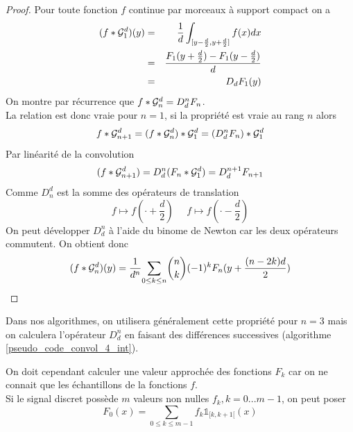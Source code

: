\begin{proof}
Pour toute fonction $f$ continue par morceaux à support compact on a 
\begin{eqnarray*}
(f * \mathcal{G}_1^d )(y)&=&\frac{1}{d} \int_{[y-\frac{d}{2},y+\frac{d}{2}]} f(x) dx\\
               &=&\frac{F_{1}(y+\frac{d}{2})-F_{1}(y-\frac{d}{2})}{d}\\
               &=&D_d F_{1}(y)
\end{eqnarray*}
On montre par récurrence que $ f*\mathcal{G}_n^d=D_d^n F_{n}$.\\
La relation est donc vraie pour $n=1$, si la propriété est vraie au rang $n$ alors
\begin{equation*}
f*\mathcal{G}_{n+1}^{d}=(f * \mathcal{G}_{n}^d) * \mathcal{G}_{1}^{d}= (D_d^n F_{n})*\mathcal{G}_1^d 
\end{equation*}
Par linéarité de la convolution
\begin{equation*}
(f*\mathcal{G}_{n+1}^{d}) = D_d^n (F_{n}*\mathcal{G}_1^d) = D_d^{n+1} F_{n+1}
\end{equation*}
Comme $D_n^d$ est la somme des opérateurs de translation
\begin{equation*}
f\mapsto f(\cdot+\frac{d}{2})~~~~~~f\mapsto f(\cdot-\frac{d}{2})
\end{equation*}
On peut développer $D_d^n$ à l'aide du binome de Newton car les deux opérateurs commutent. On obtient donc
\begin{equation*}
(f*\mathcal{G}_n^d)(y) = \frac{1}{d^n}\underset{0 \le k\le n}{\sum} \binom{n}{k}(-1)^{k} F_{n}(y+\frac{(n-2k)d}{2})
\end{equation*}

\end{proof}
Dans nos algorithmes, on utilisera généralement cette propriété pour $n=3$ mais on calculera l'opérateur $D_d^n$ en faisant des différences successives (algorithme \ref{pseudo_code_convol_4_int}).

On doit cependant calculer une valeur approchée des fonctions $F_{k}$  car on ne connait que les échantillons de la fonctions $f$.\\
Si le signal discret possède $m$ valeurs non nulles $f_k,k=0...m-1$, on peut poser 
\begin{equation*}
F_{0} (x) =\underset{0\le k \le m-1}{\sum}f_{k} \mathds{1}_{[k,k+1[}(x)
\end{equation*}

